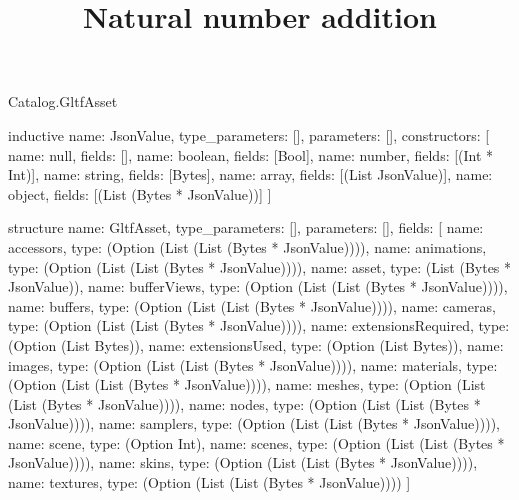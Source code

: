 \begin{lexlean}{Catalog.GltfAsset}
\title{Natural number addition}
\begin{semanticmodule}
inductive{
  name: JsonValue,
  type_parameters: [],
  parameters: [],
  constructors: [
    {name: null, fields: []},
    {name: boolean, fields: [Bool]},
    {name: number, fields: [(Int * Int)]},
    {name: string, fields: [Bytes]},
    {name: array, fields: [(List JsonValue)]},
    {name: object, fields: [(List (Bytes * JsonValue))]}
  ]
}

structure{
  name: GltfAsset,
  type_parameters: [],
  parameters: [],
  fields: [
    {name: accessors, type: (Option (List (List (Bytes * JsonValue))))},
    {name: animations, type: (Option (List (List (Bytes * JsonValue))))},
    {name: asset, type: (List (Bytes * JsonValue))},
    {name: bufferViews, type: (Option (List (List (Bytes * JsonValue))))},
    {name: buffers, type: (Option (List (List (Bytes * JsonValue))))},
    {name: cameras, type: (Option (List (List (Bytes * JsonValue))))},
    {name: extensionsRequired, type: (Option (List Bytes))},
    {name: extensionsUsed, type: (Option (List Bytes))},
    {name: images, type: (Option (List (List (Bytes * JsonValue))))},
    {name: materials, type: (Option (List (List (Bytes * JsonValue))))},
    {name: meshes, type: (Option (List (List (Bytes * JsonValue))))},
    {name: nodes, type: (Option (List (List (Bytes * JsonValue))))},
    {name: samplers, type: (Option (List (List (Bytes * JsonValue))))},
    {name: scene, type: (Option Int)},
    {name: scenes, type: (Option (List (List (Bytes * JsonValue))))},
    {name: skins, type: (Option (List (List (Bytes * JsonValue))))},
    {name: textures, type: (Option (List (List (Bytes * JsonValue))))}
  ]
}
\end{semanticmodule}
\end{lexlean}

